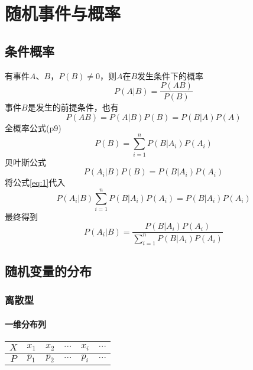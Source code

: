 
\section{随机事件与概率}

\subsection{条件概率}

有事件$A$、$B$，$P(B) \neq 0$，则$A$在$B$发生条件下的概率
\begin{equation*}
  P(A|B) = \frac{P(AB)}{P(B)}
\end{equation*}
事件$B$是发生的前提条件，也有
\begin{equation*}
  \label{eq:40011034953419}
  P(AB) = P(A|B) P(B) = P(B|A)P(A)
\end{equation*}
全概率公式(p9)
\begin{equation}
  \label{eq:1}
  P(B) = \sum_{i=1}^n P(B|A_i) P(A_i)
\end{equation}
贝叶斯公式
\begin{equation*}
  P(A_i | B) P(B) = P(B | A_i) P(A_i)
\end{equation*}
将公式\ref{eq:1}代入
\begin{equation*}
   P(A_i | B) \sum_{i=1}^n P(B|A_i) P(A_i) = P(B | A_i) P(A_i)
 \end{equation*}
最终得到
 \begin{equation*}
    P(A_i | B) = \frac{P(B | A_i) P(A_i)}{ \sum\limits_{i=1}^n P(B|A_i) P(A_i) }
  \end{equation*}
\subsection{随机变量的分布}
\subsubsection{离散型}  

\paragraph{一维分布列}


\begin{table}[H]
\begin{tabular}{c|ccccc}
  $X$ & $x_1$ &$x_2$ & $\cdots$&$x_i$ & $\cdots $\\
  \hline
  $P$&$p_1$&$p_2$&$\cdots$&$p_i$&$\cdots$
\end{tabular}
\end{table}

